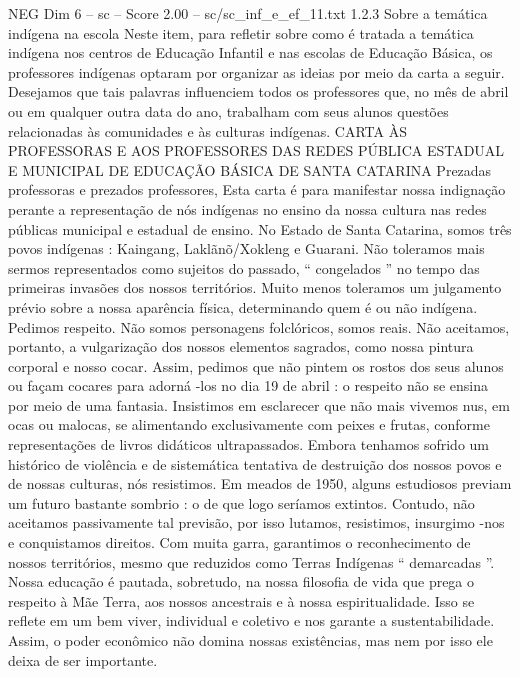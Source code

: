 \begin{textsample}{NEG Dim 6 – sc – Score 2.00 – sc/sc\_inf\_e\_ef\_11.txt}  \label{ex:f6_neg_277}
1.2.3 Sobre a temática indígena na escola Neste item, para refletir sobre como é tratada a temática indígena nos centros de Educação Infantil e nas escolas de Educação Básica, os professores indígenas optaram por organizar as ideias por meio da carta a seguir.
Desejamos que tais palavras influenciem todos os professores que, no mês de abril ou em qualquer outra data do ano, trabalham com seus alunos questões relacionadas às comunidades e às culturas indígenas.
CARTA ÀS PROFESSORAS E AOS PROFESSORES DAS REDES PÚBLICA ESTADUAL E MUNICIPAL DE EDUCAÇÃO BÁSICA DE SANTA CATARINA Prezadas professoras e prezados professores, Esta carta é para manifestar nossa indignação perante a representação de nós indígenas no ensino da nossa cultura nas redes públicas municipal e estadual de ensino.
No Estado de Santa Catarina, somos três povos indígenas : Kaingang, Laklãnõ/Xokleng e Guarani.
Não toleramos mais sermos representados como sujeitos do passado, “ congelados ” no tempo das primeiras invasões dos nossos territórios.
Muito menos toleramos um julgamento prévio sobre a nossa aparência física, determinando quem é ou não indígena.
Pedimos respeito.
Não somos personagens folclóricos, somos reais.
Não aceitamos, portanto, a vulgarização dos nossos elementos sagrados, como nossa pintura corporal e nosso cocar.
Assim, pedimos que não pintem os rostos dos seus alunos ou façam cocares para adorná -los no dia 19 de abril : o respeito não se ensina por meio de uma fantasia.
Insistimos em esclarecer que não mais vivemos nus, em ocas ou malocas, se alimentando exclusivamente com peixes e frutas, conforme representações de livros didáticos ultrapassados.
Embora tenhamos sofrido um histórico de violência e de sistemática tentativa de destruição dos nossos povos e de nossas culturas, nós resistimos.
Em meados de 1950, alguns estudiosos previam um futuro bastante sombrio : o de que logo seríamos extintos.
Contudo, não aceitamos passivamente tal previsão, por isso lutamos, resistimos, insurgimo -nos e conquistamos direitos.
Com muita garra, garantimos o reconhecimento de nossos territórios, mesmo que reduzidos como Terras Indígenas “ demarcadas ”.
Nossa educação é pautada, sobretudo, na nossa filosofia de vida que prega o respeito à Mãe Terra, aos nossos ancestrais e à nossa espiritualidade.
Isso se reflete em um bem viver, individual e coletivo e nos garante a sustentabilidade.
Assim, o poder econômico não domina nossas existências, mas nem por isso ele deixa de ser importante.

\end{textsample}
